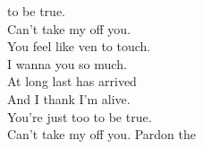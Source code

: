   to be true. \\
\songwordfb{} Can't take my  off you. \\
\songwordfb{} You feel like ven to touch. \\
\songwordfb{} I wanna  you so much. \\
\songwordfb{} At long last  has arrived \\
\songwordfb{} And I thank  I'm alive. \\
\songwordfb{} You're just too  to be true.\\
\songwordfb{} Can't take my  off you. 
\songwordfb{} Pardon the \\
